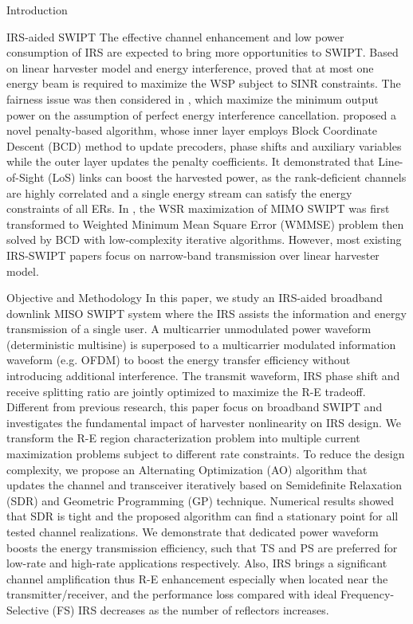 \documentclass{IEEEtran}
\begin{document}
\begin{section}{Introduction}
	\begin{subsection}{IRS-aided SWIPT}
		The effective channel enhancement and low power consumption of IRS are expected to bring more opportunities to SWIPT. Based on linear harvester model and energy interference, \cite{Wu2019b} proved that at most one energy beam is required to maximize the WSP subject to SINR constraints. The fairness issue was then considered in \cite{Tang2019}, which maximize the minimum output power on the assumption of perfect energy interference cancellation. \cite{Wu2019c} proposed a novel penalty-based algorithm, whose inner layer employs Block Coordinate Descent (BCD) method to update precoders, phase shifts and auxiliary variables while the outer layer updates the penalty coefficients. It demonstrated that Line-of-Sight (LoS) links can boost the harvested power, as the rank-deficient channels are highly correlated and a single energy stream can satisfy the energy constraints of all ERs. In \cite{Pan2019a}, the WSR maximization of MIMO SWIPT was first transformed to Weighted Minimum Mean Square Error (WMMSE) problem then solved by BCD with low-complexity iterative algorithms. However, most existing IRS-SWIPT papers focus on narrow-band transmission over linear harvester model.
	\end{subsection}

	\begin{subsection}{Objective and Methodology}
		In this paper, we study an IRS-aided broadband downlink MISO SWIPT system where the IRS assists the information and energy transmission of a single user. A multicarrier unmodulated power waveform (deterministic multisine) is superposed to a multicarrier modulated information waveform (e.g. OFDM) to boost the energy transfer efficiency without introducing additional interference. The transmit waveform, IRS phase shift and receive splitting ratio are jointly optimized to maximize the R-E tradeoff. Different from previous research, this paper focus on broadband SWIPT and investigates the fundamental impact of harvester nonlinearity on IRS design. We transform the R-E region characterization problem into multiple current maximization problems subject to different rate constraints. To reduce the design complexity, we propose an Alternating Optimization (AO) algorithm that updates the channel and transceiver iteratively based on Semidefinite Relaxation (SDR) and Geometric Programming (GP) technique. Numerical results showed that SDR is tight and the proposed algorithm can find a stationary point for all tested channel realizations. We demonstrate that dedicated power waveform boosts the energy transmission efficiency, such that TS and PS are preferred for low-rate and high-rate applications respectively. Also, IRS brings a significant channel amplification thus R-E enhancement especially when located near the transmitter/receiver, and the performance loss compared with ideal Frequency-Selective (FS) IRS decreases as the number of reflectors increases.
	\end{subsection}
\end{section}
\end{document}
